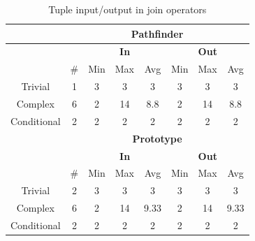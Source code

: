 \begin{table}[!htp]
 \begin{center}
 \begin{tabular}{| c | c | c | c | c | c | c | c |}
  \hline
   & \multicolumn{7}{|c|}{\textbf{Pathfinder}} \\
   \hline
   &  & \multicolumn{3}{|c|}{\textbf{In}} &
   \multicolumn{3}{|c|}{\textbf{Out}}  \\
   \hline
   &  \# & Min & Max & Avg & Min & Max & Avg\\
   \hline
   Trivial & 1 & 3 & 3 & 3 & 3 & 3 & 3  \\
   \hline
   Complex & 6 & 2 & 14 & 8.8 & 2 & 14 & 8.8  \\
   \hline
   Conditional & 2 & 2 & 2 & 2 & 2 & 2 & 2  \\
   \hline
   & \multicolumn{7}{|c|}{\textbf{Prototype}} \\
   \hline
   &  & \multicolumn{3}{|c|}{\textbf{In}} &
   \multicolumn{3}{|c|}{\textbf{Out}} \\
   \hline
   & \# & Min & Max & Avg & Min & Max & Avg \\
   \hline
   Trivial & 2 & 3 & 3 & 3 & 3 & 3 & 3 \\
   \hline
   Complex & 6 & 2 & 14 & 9.33 & 2 & 14 & 9.33 \\
   \hline
   Conditional & 2 & 2 & 2 & 2 & 2 & 2 & 2 \\
   \hline
 \end{tabular}
\caption{Tuple input/output in join operators}
\label{table:result:complexity_matrix}
 \end{center}
\end{table}